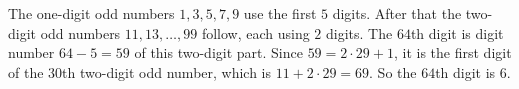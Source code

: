The one-digit odd numbers $1,3,5,7,9$ use the first $5$ digits. After that the two-digit odd numbers $11,13,\dots,99$ follow, each using $2$ digits. The $64$th digit is digit number $64-5=59$ of this two-digit part. Since $59=2\cdot29+1$, it is the first digit of the $30$th two-digit odd number, which is $11+2\cdot29=69$. So the $64$th digit is $\boxed{6}$.
